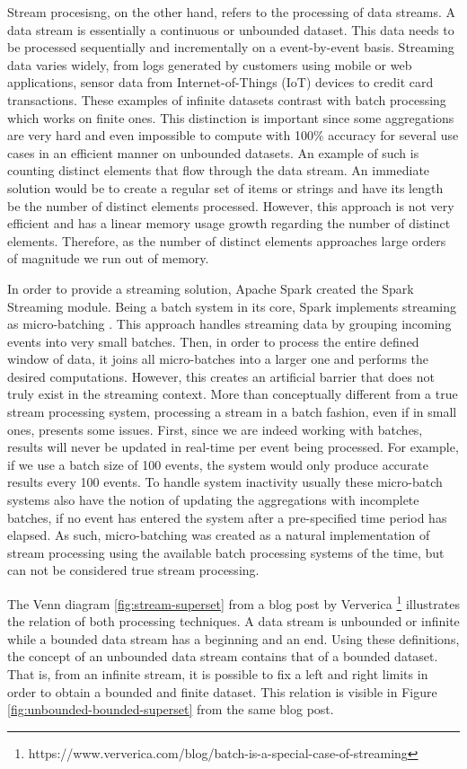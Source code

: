 Stream procesisng, on the other hand, refers to the processing of data streams. A data stream is essentially a continuous or unbounded dataset. This data needs to be processed sequentially and incrementally on a event-by-event basis. Streaming data varies widely, from logs generated by customers using mobile or web applications, sensor data from Internet-of-Things (IoT) devices to credit card transactions. These examples of infinite datasets contrast with batch processing which works on finite ones. This distinction is important since some aggregations are very hard and even impossible to compute with 100\% accuracy for several use cases in an efficient manner on unbounded datasets. An example of such is counting distinct elements that flow through the data stream. An immediate solution would be to create a regular set of items or strings and have its length be the number of distinct elements processed. However, this approach is not very efficient and has a linear memory usage growth regarding the number of distinct elements. Therefore, as the number of distinct elements approaches large orders of magnitude we run out of memory.

In order to provide a streaming solution, Apache Spark created the Spark Streaming \cite{SparkStreaming} module. Being a batch system in its core, Spark implements streaming as micro-batching \cite{SparkStreamingPaper}. This approach handles streaming data by grouping incoming events into very small batches. Then, in order to process the entire defined window of data, it joins all micro-batches into a larger one and performs the desired computations. However, this creates an artificial barrier that does not truly exist in the streaming context. More than conceptually different from a true stream processing system, processing a stream in a batch fashion, even if in small ones, presents some issues. First, since we are indeed working with batches, results will never be updated in real-time per event being processed. For example, if we use a batch size of 100 events, the system would only produce accurate results every 100 events. To handle system inactivity usually these micro-batch systems also have the notion of updating the aggregations with incomplete batches, if no event has entered the system after a pre-specified time period has elapsed. As such, micro-batching was created as a natural implementation of stream processing using the available batch processing systems of the time, but can not be considered true stream processing.

The Venn diagram \ref{fig:stream-superset} from a blog post by Ververica \footnote{https://www.ververica.com/blog/batch-is-a-special-case-of-streaming} illustrates the relation of both processing techniques. A data stream is unbounded or infinite while a bounded data stream has a beginning and an end. Using these definitions, the concept of an unbounded data stream contains that of a bounded dataset. That is, from an infinite stream, it is possible to fix a left and right limits in order to obtain a bounded and finite dataset. This relation is visible in Figure \ref{fig:unbounded-bounded-superset} from the same blog post.

